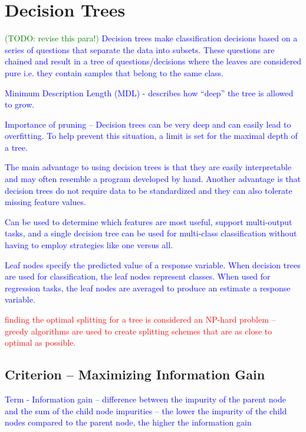\section{Decision Trees}

\textcolor{blue}{\textcolor{green}{(TODO: revise this para!)} Decision trees make classification decisions based on a series of questions that separate the data into subsets. These questions are chained and result in a tree of questions/decisions where the leaves are considered pure i.e. they contain samples that belong to the same class.}

\textcolor{blue}{Minimum Description Length (MDL) - describes how ``deep'' the tree is allowed to grow.}

\textcolor{blue}{Importance of pruning -- Decision trees can be very deep and can easily lead to overfitting. To help prevent this situation, a limit is set for the maximal depth of a tree. }

\textcolor{blue}{The main advantage to using decision trees is that they are easily interpretable and may often resemble a program developed by hand. Another advantage is that decision trees do not require data to be standardized and they can also tolerate missing feature values.}

\textcolor{blue}{Can be used to determine which features are most useful, support multi-output tasks, and a single decision tree can be used for multi-class classification without having to employ strategies like one versus all.}

\textcolor{blue}{Leaf nodes specify the predicted value of a response variable. When decision trees are used for classification, the leaf nodes represent classes. When used for regression tasks, the leaf nodes are averaged to produce an estimate a response variable.}

\textcolor{red}{finding the optimal splitting for a tree is considered an NP-hard problem -- greedy algorithms are used to create splitting schemes that are as close to optimal as possible.}

\subsection{Criterion -- Maximizing Information Gain}

\textcolor{blue}{Term - Information gain -- difference between the impurity of the parent node and the sum of the child node impurities -- the lower the impurity of the child nodes compared to the parent node, the higher the information gain}


